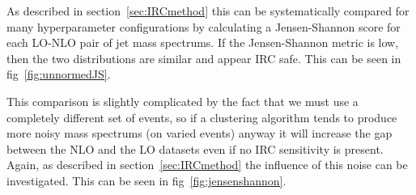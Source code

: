 \begin{figure}[htp]
\end{figure}    

%
%

As described in section~\ref{sec:IRCmethod} this can be systematically compared for many hyperparameter configurations by calculating a Jensen-Shannon
score for each LO-NLO pair of jet mass spectrums.
If the Jensen-Shannon metric is low, then the two distributions are similar and appear IRC safe.
This can be seen in fig~\ref{fig:unnormedJS}.

This comparison is slightly complicated by the fact that we must use a completely different set of events,
so if a clustering algorithm tends to produce more noisy mass spectrums (on varied events)
anyway it will increase the gap between the NLO and the LO datasets even if no IRC sensitivity is present.
Again, as described in section~\ref{sec:IRCmethod} the influence of this noise can be investigated.
This can be seen in fig~\ref{fig:jensenshannon}.

